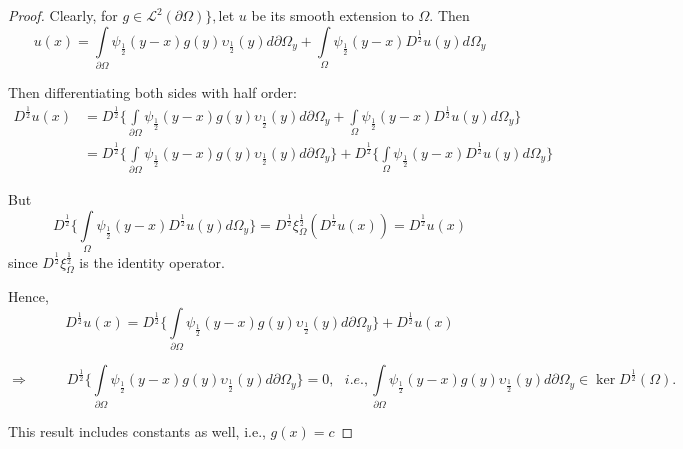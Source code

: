 \documentclass{amsart}%
\theoremstyle{plain}
\numberwithin{equation}{section}
\begin{document}
\begin{proof}
Clearly, for $g\in%
\mathcal{L}%
^{2}\left(  \partial\Omega\right)  \},$let $u$ be its smooth extension to
$\Omega$. Then
\[
u(x)=%
{\displaystyle\int\limits_{\partial\Omega}}
\psi_{\frac{1}{2}}\left(  y-x\right)  g(y)\upsilon_{\frac{1}{2}}\left(
y\right)  d\partial\Omega_{y}+%
{\displaystyle\int\limits_{\Omega}}
\psi_{\frac{1}{2}}\left(  y-x\right)  D^{\frac{1}{2}}u\left(  y\right)
d\Omega_{y}%
\]


Then differentiating both sides with half order:
\begin{align*}
D^{\frac{1}{2}}u(x)  & =D^{\frac{1}{2}}\{%
{\displaystyle\int\limits_{\partial\Omega}}
\psi_{\frac{1}{2}}\left(  y-x\right)  g(y)\upsilon_{\frac{1}{2}}\left(
y\right)  d\partial\Omega_{y}+%
{\displaystyle\int\limits_{\Omega}}
\psi_{\frac{1}{2}}\left(  y-x\right)  D^{\frac{1}{2}}u\left(  y\right)
d\Omega_{y}\}\\
& =D^{\frac{1}{2}}\{%
{\displaystyle\int\limits_{\partial\Omega}}
\psi_{\frac{1}{2}}\left(  y-x\right)  g(y)\upsilon_{\frac{1}{2}}\left(
y\right)  d\partial\Omega_{y}\}+D^{\frac{1}{2}}\{%
{\displaystyle\int\limits_{\Omega}}
\psi_{\frac{1}{2}}\left(  y-x\right)  D^{\frac{1}{2}}u\left(  y\right)
d\Omega_{y}\}
\end{align*}


But
\[
D^{\frac{1}{2}}\{%
{\displaystyle\int\limits_{\Omega}}
\psi_{\frac{1}{2}}\left(  y-x\right)  D^{\frac{1}{2}}u\left(  y\right)
d\Omega_{y}\}=D^{\frac{1}{2}}\xi_{\Omega}^{\frac{1}{2}}(D^{\frac{1}{2}%
}u(x))=D^{\frac{1}{2}}u(x)
\]
since $D^{\frac{1}{2}}\xi_{\Omega}^{\frac{1}{2}}$ is the identity operator.

Hence,
\[
D^{\frac{1}{2}}u(x)=D^{\frac{1}{2}}\{%
{\displaystyle\int\limits_{\partial\Omega}}
\psi_{\frac{1}{2}}\left(  y-x\right)  g(y)\upsilon_{\frac{1}{2}}\left(
y\right)  d\partial\Omega_{y}\}+D^{\frac{1}{2}}u(x)
\]
%

\[
\Longrightarrow\ \ \ \ \ \ \ \ \ \ \ \ D^{\frac{1}{2}}\{%
{\displaystyle\int\limits_{\partial\Omega}}
\psi_{\frac{1}{2}}\left(  y-x\right)  g(y)\upsilon_{\frac{1}{2}}\left(
y\right)  d\partial\Omega_{y}\}=0,\text{ \ }i.e.,%
{\displaystyle\int\limits_{\partial\Omega}}
\psi_{\frac{1}{2}}\left(  y-x\right)  g(y)\upsilon_{\frac{1}{2}}\left(
y\right)  d\partial\Omega_{y}\in\ker D^{\frac{1}{2}}\left(  \Omega\right)  .
\]


This result includes constants as well, i.e., $g(x)=c$
\end{proof}
\end{document}
